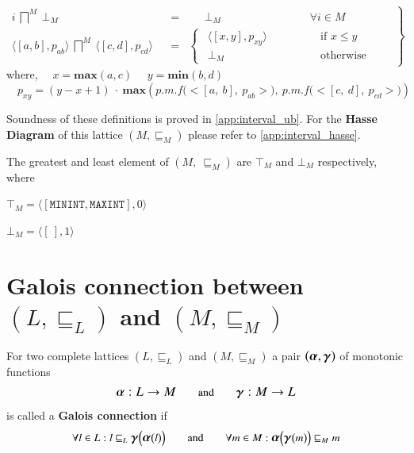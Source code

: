 \documentclass[final,3p, review, times]{Elsevier/elsarticle}
\newcommand{\ALPHA}{\large\boldsymbol{\alpha}\normalsize}
\newcommand{\GAMMA}{\large\boldsymbol{\gamma}\normalsize}
\begin{document}
\begin{equation}
\label{eq:glb_M}
 \left.\begin{aligned}
        i\ \bigsqcap^M\ \bot_M&&=&\quad\ \ \bot_M\qquad\qquad\qquad\qquad\text{$\forall i\in M$}&\\
        \langle[a,b],p_{ab}\rangle\ \bigsqcap^M\ \langle[c,d],p_{cd}\rangle&&=&\begin{cases} 
   			  \ \ \langle[x,y],p_{xy}\rangle&\qquad\qquad\text{if }x\leq y\\
   			  \ \ \bot_M&\qquad\qquad\text{otherwise}
  			\end{cases}
       \end{aligned}\quad
 \right\}
\end{equation}
where,
	$\quad x=\mathbf{max}(a,c)$
	$\quad y=\mathbf{min}(b,d)$
	$\quad\displaystyle p_{xy}=(y-x+1)\ \cdot\ \mathbf{max}\left(p.m.f\Big(\big<[a,\ b],\ p_{ab}\big>\Big),\ p.m.f\Big(\big<[c,\ d],\ p_{cd}\big>\Big)\right)$

Soundness of these definitions is proved in \ref{app:interval_ub}. For the \textbf{Hasse Diagram} of this lattice $(M,\sqsubseteq_M)$ please refer to \ref{app:interval_hasse}.

The greatest and least element of $(M,\ \sqsubseteq_M)$ are $\top_M$ and $\bot_M$ respectively, where

$\top_M=\langle[\mathtt{MININT},\mathtt{MAXINT}],0\rangle$

$\bot_M=\langle[\ ],1\rangle$

\section{Galois connection between $(L,\sqsubseteq_L)$ and $(M,\sqsubseteq_M)$}

For two complete lattices $(L,\sqsubseteq_L)$ and $(M,\sqsubseteq_M)$ a pair $(\ALPHA,\GAMMA)$ of monotonic functions
$$\ALPHA :L\to M\qquad\text{and}\qquad\GAMMA :M\to L$$
is called a \textbf{Galois connection} if
$$\forall l\in L : l\sqsubseteq_L \GAMMA\Big(\ALPHA\big(l\big)\Big)\qquad\text{and}\qquad\forall m\in M : \ALPHA\Big(\GAMMA\big(m\big)\Big)\sqsubseteq_M m$$
\end{document}
